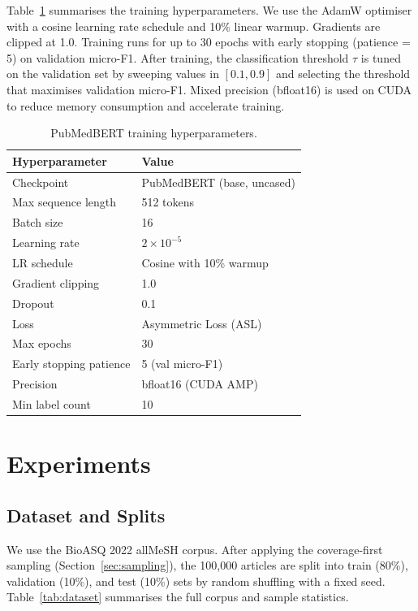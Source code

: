 \documentclass[sigconf]{acmart}
\begin{document}
Table~\ref{tab:hparams} summarises the training hyperparameters. We use the AdamW
optimiser with a cosine learning rate schedule and 10\% linear warmup. Gradients are
clipped at 1.0. Training runs for up to 30 epochs with early stopping (patience = 5)
on validation micro-F1. After training, the classification threshold $\tau$ is tuned on
the validation set by sweeping values in $[0.1, 0.9]$ and selecting the threshold that
maximises validation micro-F1. Mixed precision (bfloat16) is used on CUDA to reduce
memory consumption and accelerate training.

\begin{table}[h]
\caption{PubMedBERT training hyperparameters.}
\label{tab:hparams}
\begin{tabular}{ll}
\toprule
\textbf{Hyperparameter} & \textbf{Value} \\
\midrule
Checkpoint & PubMedBERT (base, uncased) \\
Max sequence length & 512 tokens \\
Batch size & 16 \\
Learning rate & $2 \times 10^{-5}$ \\
LR schedule & Cosine with 10\% warmup \\
Gradient clipping & 1.0 \\
Dropout & 0.1 \\
Loss & Asymmetric Loss (ASL) \\
Max epochs & 30 \\
Early stopping patience & 5 (val micro-F1) \\
Precision & bfloat16 (CUDA AMP) \\
Min label count & 10 \\
\bottomrule
\end{tabular}
\end{table}

\section{Experiments}
\label{sec:experiments}

\subsection{Dataset and Splits}

We use the BioASQ 2022 allMeSH corpus. After applying the coverage-first sampling
(Section~\ref{sec:sampling}), the 100{,}000 articles are split into train (80\%), validation
(10\%), and test (10\%) sets by random shuffling with a fixed seed. Table~\ref{tab:dataset}
summarises the full corpus and sample statistics.
\end{document}
